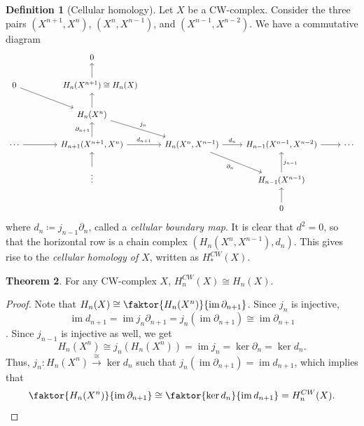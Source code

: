 \documentclass[10pt,letterpaper,cm]{nupset}
\theoremstyle{definition}
\newtheorem{definition}{Definition}[subsection]
\theoremstyle{theorem}
\newtheorem{theorem}[definition]{Theorem}
\theoremstyle{remark}
\newcommand{\1}{\mathbb{1}}
\newcommand{\0}{\vec 0}
\DeclareMathOperator{\im}{im}
\begin{document}
\begin{definition}[Cellular homology]
Let $X$ be a CW-complex. Consider the three pairs $(X^{n+1}, X^n)$, $(X^n, X^{n-1})$, and $(X^{n-1}, X^{n-2})$. We have a commutative diagram
\[
\begin{tikzcd}
                 & 0                                                                        &                                                                &                                        &        \\
0 \arrow[rd]     & {\quad \quad H_n(X^{n+1})\cong H_n(X)} \arrow[u]                                       &                                                                &                                        &        \\
                 & H_n(X^n) \arrow[rd, "j_n"] \arrow[u]                                     &                                                                &                                        &        \\
\cdots \arrow[r] & {H_{n+1}(X^{n+1}, X^n)} \arrow[r, "d_{n+1}"] \arrow[u, "\partial_{n+1}"] & {H_n(X^n, X^{n-1})} \arrow[rd, "\partial_n"'] \arrow[r, "d_n"] & {H_{n-1}(X^{n-1}, X^{n-2})} \arrow[r]  & \cdots \\
                 & \vdots \arrow[u]                                                         &                                                                & H_{n-1}(X^{n-1}) \arrow[u, "j_{n-1}"'] &        \\
                 &                                                                          &                                                                & 0 \arrow[u]                            &       
\end{tikzcd}
\] where $d_n \coloneqq  j_{n-1}{\partial_n}$, called a \textit{cellular boundary map}. It is clear that $d^2 =0$, so that the horizontal row is a chain complex $(H_n(X^n, X^{n-1}), d_n)$. This gives rise to the \textit{cellular homology of $X$}, written as $H_{\ast}^{CW}(X)$.
\end{definition}

\begin{theorem}
For any CW-complex $X$, $H_n^{CW}(X) \cong H_n(X)$.
\end{theorem}
\begin{proof}
Note that $H_n(X) \cong \faktor{H_n(X^n)}{\im{\partial_{n+1}}}$. Since $j_n$ is injective, $$\im{d_{n+1}} = \im{j_n{\partial_{n+1}}} = j_n(\im{\partial_{n+1}}) \cong \im{\partial_{n+1}}$$. Since $j_{n-1}$ is injective as well, we get $$H_n(X^n) \cong j_n(H_n(X^n)) = \im{j_n} = \ker{\partial_n} = \ker{d_n}.$$ Thus, $j_n : H_n(X^n) \overset{\cong}{\longrightarrow} \ker{d_n}$ such that $j_n(\im{\partial_{n+1}}) = \im{d_{n+1}}$, which implies that $$ \faktor{H_n(X^n)}{\im{\partial_{n+1}}} \cong \faktor{\ker{d_n}}{\im{d_{n+1}}} = H_n^{CW}(X).$$
\end{proof}
\end{document}
